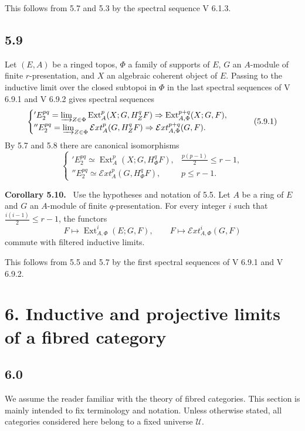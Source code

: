 \documentclass[11pt]{article}
\newcommand{\U}{\mathcal{U}}
\newcommand{\Ext}{\operatorname{Ext}}
\newenvironment{statement}[1]{\par\medskip\noindent\textbf{#1.}\ }{\par\medskip}
\begin{document}
This follows from 5.7 and 5.3 by the spectral sequence V 6.1.3.

\subsection*{5.9}
Let \((E,A)\) be a ringed topos, \(\Phi\) a family of supports of \(E\), \(G\) an \(A\)-module of finite \(r\)-presentation, and \(X\) an algebraic coherent object of \(E\). Passing to the inductive limit over the closed subtopoi in \(\Phi\) in the last spectral sequences of V 6.9.1 and V 6.9.2 gives spectral sequences
\[
\begin{cases}
{}'E^{pq}_2=\varinjlim_{Z\in\Phi}\Ext^p_A(X;G,H^q_ZF)\Rightarrow \Ext^{p+q}_{A,\Phi}(X;G,F),\\
{}''E^{pq}_2=\varinjlim_{Z\in\Phi}\mathcal Ext^p_A(G,H^q_ZF)\Rightarrow \mathcal Ext^{p+q}_{A,\Phi}(G,F).
\end{cases}\tag{5.9.1}
\]
By 5.7 and 5.8 there are canonical isomorphisms
\[
\begin{cases}
{}'E^{pq}_2\simeq \Ext^p_A(X;G,H^q_\Phi F),& \frac{p(p-1)}2\le r-1,\\
{}''E^{pq}_2\simeq \mathcal Ext^p_A(G,H^q_\Phi F),& p\le r-1.
\end{cases}\tag{5.9.2}
\]

\begin{statement}{Corollary 5.10}
Use the hypotheses and notation of 5.5. Let \(A\) be a ring of \(E\) and \(G\) an \(A\)-module of finite \(q\)-presentation. For every integer \(i\) such that \(\frac{i(i-1)}2\le r-1\), the functors
\[
 F\mapsto \Ext^i_{A,\Phi}(E;G,F),\qquad F\mapsto \mathcal Ext^i_{A,\Phi}(G,F)
\]
commute with filtered inductive limits.
\end{statement}

This follows from 5.5 and 5.7 by the first spectral sequences of V 6.9.1 and V 6.9.2.

\section*{6. Inductive and projective limits of a fibred category}

\subsection*{6.0}
We assume the reader familiar with the theory of fibred categories. This section is mainly intended to fix terminology and notation. Unless otherwise stated, all categories considered here belong to a fixed universe \(\U\).
\end{document}
